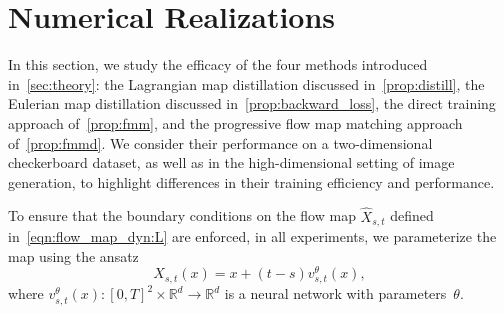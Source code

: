 \section{Numerical Realizations}
\label{sec:exp}
In this section, we study the efficacy of the four methods introduced in~\cref{sec:theory}:
the Lagrangian map distillation discussed in~\cref{prop:distill}, the Eulerian map distillation discussed in~\cref{prop:backward_loss}, the direct training approach of~\cref{prop:fmm}, and the progressive flow map matching approach of~\cref{prop:fmmd}.
%
We consider their performance on a two-dimensional checkerboard dataset, as well as in the high-dimensional setting of image generation, to highlight differences in their training efficiency and performance.

To ensure that the boundary conditions on the flow map $\hat X_{s,t}$ defined in~\eqref{eqn:flow_map_dyn:L} are enforced, in all experiments, we parameterize the map using the ansatz
\begin{equation}
	\label{eq:map:anstaz}
	X_{s,t}(x) = x + (t-s) v^\theta_{s,t}(x),
\end{equation}
where $v^\theta_{s,t}(x) : [0,T]^2 \times \mathbb R^d \rightarrow \mathbb R^d$ is a neural network with parameters~$\theta$.


